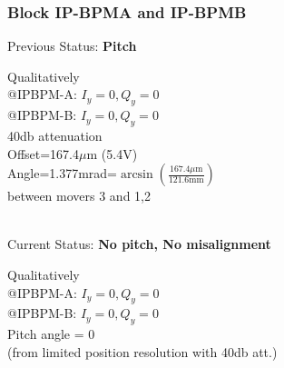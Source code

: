 \subsubsection{Block IP-BPMA and IP-BPMB}
Previous Status: \textbf{Pitch}\\
\begin{minipage}{0.5\textwidth}
\end{minipage}\hfill\hspace*{-2cm}\vspace*{2cm}
\begin{minipage}{0.5\textwidth}
Qualitatively\\
@IPBPM-A: $I_y=0, Q_y=0$\\
@IPBPM-B: $I_y=0, Q_y=0$\\
40db attenuation\\
Offset=167.4$\mu$m (5.4V)\\
Angle=1.377mrad=$\arcsin\left(\frac{167.4\mu \text{m}}{121.6\text{mm}}\right)$\\
\hspace*{0.7cm}between movers 3 and 1,2\\
\end{minipage}\\
\vspace*{-2.0cm}
Current Status: \textbf{No pitch, No misalignment}\\
\begin{minipage}{0.5\textwidth}
\end{minipage}\hfill\hspace*{-2cm}
\begin{minipage}{0.5\textwidth}
Qualitatively\\
@IPBPM-A: $I_y=0, Q_y=0$\\
@IPBPM-B: $I_y=0, Q_y=0$\\
Pitch angle = 0\\
(from limited position resolution with 40db att.)
\end{minipage}\\


